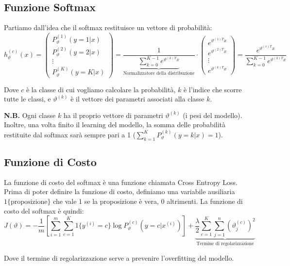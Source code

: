\subsection{Funzione Softmax}
Partiamo dall'idea che il softmax restituisce un vettore di probabilità:
\[
h_{\vartheta}^{(c)}(x) = 
\begin{pmatrix}
P_{\vartheta}^{(1)}(y=1 | x) \\
P_{\vartheta}^{(2)}(y=2 | x) \\
\vdots \\
P_{\vartheta}^{(K)}(y=K | x)
\end{pmatrix}
= 
\frac{1}{\underbrace{\sum_{k=0}^{K-1} e^{\vartheta^{(k) T} x}}_{\text{Normalizzatore della distribuzione}}}
\cdot
\begin{pmatrix}
e^{\vartheta^{(1) T} x} \\
e^{\vartheta^{(2) T} x} \\
\vdots \\
e^{\vartheta^{(k) T} x}
\end{pmatrix}
=
\frac{e^{\vartheta^{(c) T} x}}{\sum_{k=0}^{K-1} e^{\vartheta^{(k) T} x}}
\]

\noindent
Dove $c$ è la classe di cui vogliamo calcolare la probabilità, $k$ è l'indice che scorre tutte le classi, e $\vartheta^{(k)}$ è il vettore dei parametri associati alla classe $k$.

\textbf{N.B.} Ogni classe $k$ ha il proprio vettore di parametri $\vartheta^{(k)}$ (i pesi del modello). Inoltre, una volta finito il learning del modello, la somma delle probabilità restituite dal softmax sarà sempre pari a 1 ($\displaystyle\sum_{k=1}^{K} P_{\vartheta}^{(k)}(y=k | x) = 1$).

\subsection{Funzione di Costo}
La funzione di costo del softmax è una funzione chiamata Cross Entropy Loss. Prima di poter definire la funzione di costo, definiamo una variabile ausiliaria \(1\{\text{proposizione}\} \) che vale 1 se la proposizione è vera, 0 altrimenti.
La funzione di costo del softmax è quindi:
\[
J(\vartheta) = 
- \frac{1}{m} 
\left[
\sum_{i=1}^{m} \sum_{c=1}^{K} 1\{y^{(i)} = c\} \log P_{\vartheta}^{(c)}(y=c | x^{(i)})
\right]
+
\underbrace{\frac{\lambda}{2} \sum_{c=1}^{K} \sum_{j=1}^{n} (\vartheta_j^{(c)})^2}_{\text{Termine di regolarizzazione}}
\]

\noindent
Dove il termine di regolarizzazione serve a prevenire l'overfitting del modello.

